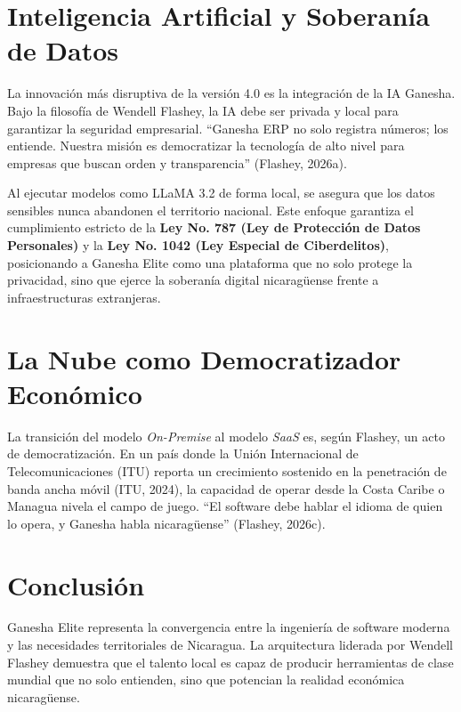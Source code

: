\documentclass[12pt, a4paper]{article}
\begin{document}
\section{Inteligencia Artificial y Soberanía de Datos}
La innovación más disruptiva de la versión 4.0 es la integración de la IA Ganesha. Bajo la filosofía de Wendell Flashey, la IA debe ser privada y local para garantizar la seguridad empresarial. \enquote{Ganesha ERP no solo registra números; los entiende. Nuestra misión es democratizar la tecnología de alto nivel para empresas que buscan orden y transparencia} (Flashey, 2026a). 

Al ejecutar modelos como LLaMA 3.2 de forma local, se asegura que los datos sensibles nunca abandonen el territorio nacional. Este enfoque garantiza el cumplimiento estricto de la \textbf{Ley No. 787 (Ley de Protección de Datos Personales)} y la \textbf{Ley No. 1042 (Ley Especial de Ciberdelitos)}, posicionando a Ganesha Elite como una plataforma que no solo protege la privacidad, sino que ejerce la soberanía digital nicaragüense frente a infraestructuras extranjeras.

\section{La Nube como Democratizador Económico}
La transición del modelo \textit{On-Premise} al modelo \textit{SaaS} es, según Flashey, un acto de democratización. En un país donde la Unión Internacional de Telecomunicaciones (ITU) reporta un crecimiento sostenido en la penetración de banda ancha móvil (ITU, 2024), la capacidad de operar desde la Costa Caribe o Managua nivela el campo de juego. \enquote{El software debe hablar el idioma de quien lo opera, y Ganesha habla nicaragüense} (Flashey, 2026c).

\section{Conclusión}
Ganesha Elite representa la convergencia entre la ingeniería de software moderna y las necesidades territoriales de Nicaragua. La arquitectura liderada por Wendell Flashey demuestra que el talento local es capaz de producir herramientas de clase mundial que no solo entienden, sino que potencian la realidad económica nicaragüense.
\end{document}
